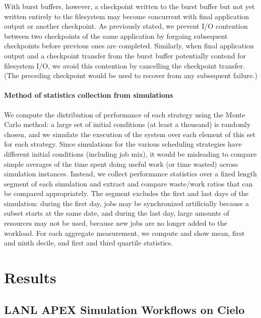 \documentclass[two]{article}
\begin{document}
With burst buffers, however, a checkpoint written to the burst buffer but not yet
written entirely to the filesystem may become concurrent with final application
output or another checkpoint.  As previously stated, we prevent I/O contention
between two checkpoints of the same application by forgoing subsequent checkpoints
before previous ones are completed.
Similarly, when final application output and a checkpoint transfer from the burst
buffer potentially contend for filesystem I/O, we avoid this contention by cancelling
the checkpoint transfer. (The preceding checkpoint would be used to recover from any
subsequent failure.)


\paragraph*{Method of statistics collection from simulations}
We compute the distribution of performance of each strategy using the
Monte Carlo method: a large set of initial conditions (at least a
thousand) is randomly chosen, and we simulate the execution of the
system over each element of this set for each strategy. Since
simulations for the various scheduling strategies have different
initial conditions (including job mix), it would be misleading to
compare simple averages of the time spent doing useful work (or time
wasted) across simulation instances. Instead, we collect performance
statistics over a fixed length segment of each simulation and extract
and compare waste/work ratios that can be compared appropriately. The
segment excludes the first and last days of the simulation: during the
first day, jobs may be synchronized artificially because a subset
starts at the same date, and during the last day, large amounts of
resources may not be used, because new jobs are no longer added to the workload.
For each aggregate measurement, we compute and show mean, first and
ninth decile, and first and third quartile statistics. 

%

\section{Results}\label{sec:results}

\subsection{LANL APEX Simulation Workflows on Cielo}
\end{document}
